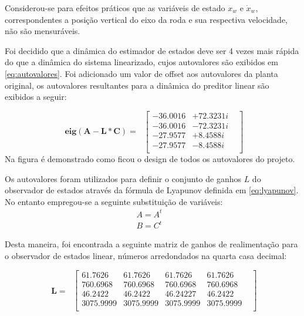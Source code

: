     Considerou-se para efeitos práticos que as variáveis de estado $x_w$ e $\dot{x}_w$, correspondentes a posição vertical do eixo da roda e sua respectiva velocidade, não são mensuráveis.

    Foi decidido que a dinâmica do estimador de estados deve ser 4 vezes  mais rápida do que a dinâmica do sistema linearizado, cujos autovalores são exibidos em \ref{eq:autovalores}. Foi adicionado um valor de offset aos autovalores da planta original, os autovalores resultantes para a dinâmica do preditor linear são exibidos a seguir:

    \begin{equation} \label{eq:autovalores_pred}
        \begin{split}
              \mathbf{eig(A-L*C)}=\
        \end{split}
        \begin{bmatrix}
             -36.0016& +72.3231i&\\
             -36.0016& -72.3231i&\\
             -27.9577& +8.4588i&\\
             -27.9577& -8.4588i&\\
        \end{bmatrix}
    \end{equation}
    Na figura  é demonstrado como ficou o design de todos os autovalores do projeto.

    Os autovalores foram utilizados para definir o conjunto de ganhos $L$ do observador de estados através da fórmula de Lyapunov definida em \ref{eq:lyapunov}. No entanto empregou-se a seguinte substituição de variáveis:
    \begin{equation} \label{eq:var_pred}
        \begin{split}
        A = A^{t}&\\
        B = C^{t}&
        \end{split}
    \end{equation}

    Desta maneira, foi encontrada a seguinte matriz de ganhos de realimentação para o observador de estados linear, números arredondados na quarta casa decimal:

    \begin{equation} \label{eq:ganhos_pred}
        \begin{split}
            \mathbf{L}=\
        \end{split}
        \begin{bmatrix}
          61.7626&   61.7626&   61.7626&   61.7626&\\
         760.6968&  760.6968&  760.6968&  760.6968&\\
          46.2422&   46.2422&   46.24227&  46.2422&\\
        3075.9999& 3075.9999& 3075.9999& 3075.9999&\\
        \end{bmatrix}
    \end{equation}

